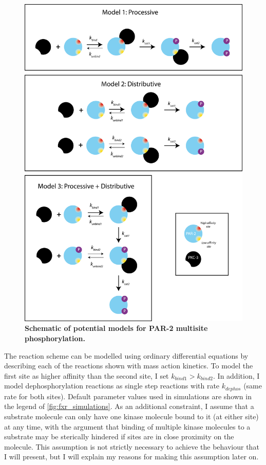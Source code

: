 \documentclass[12pt]{"report"}
\newcommand{\mycaption}[2]{\caption[#1]{\textbf{#1.} #2}}
\begin{document}
\begin{figure}
\includegraphics[scale=0.85]{fxr_phosphorylation_types}
\centering
\mycaption{Schematic of potential models for PAR-2 multisite phosphorylation}{}
\label{fig:fxr_phosphorylation_types}
\end{figure}

The reaction scheme can be modelled using ordinary differential equations by describing each of the reactions shown with mass action kinetics. To model the first site as higher affinity than the second site, I set $k_{bind1} > k_{bind2}$. In addition, I model dephosphorylation reactions as single step reactions with rate $k_{dephos}$ (same rate for both sites). Default parameter values used in simulations are shown in the legend of \cref{fig:fxr_simulations}. As an additional constraint, I assume that a substrate molecule can only have one kinase molecule bound to it (at either site) at any time, with the argument that binding of multiple kinase molecules to a substrate may be sterically hindered if sites are in close proximity on the molecule. This assumption is not strictly necessary to achieve the behaviour that I will present, but I will explain my reasons for making this assumption later on.\\
\end{document}
